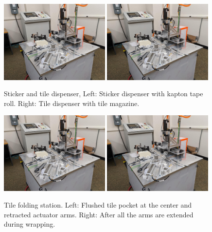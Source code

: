 \begin{figure}[!ht]
  \centering
  \includegraphics[width=0.49\textwidth,page=3]{figures/wrapper_machine_pics.pdf}
  \includegraphics[width=0.49\textwidth,page=4]{figures/wrapper_machine_pics.pdf}
  \caption[Sticker and tile dispenser.]
  {Sticker and tile dispenser, Left: Sticker dispenser
    with kapton tape roll. Right: Tile dispenser with tile magazine.}%
  \label{fig:wrapper-overview-3}
\end{figure}

\begin{figure}[!ht]
  \centering
  \includegraphics[width=0.49\textwidth,page=6]{figures/wrapper_machine_pics.pdf}
  \includegraphics[width=0.49\textwidth,page=7]{figures/wrapper_machine_pics.pdf}
  \caption[Tile folding station]
  {Tile folding station. Left: Flushed tile pocket at the center
    and retracted actuator arms. Right: After all the
    arms are extended during wrapping.}%
  \label{fig:wrapper-overview-4}
\end{figure}

